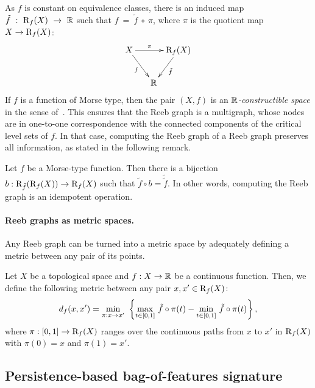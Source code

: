%
As $f$ is constant on equivalence classes, there is an induced map 
$\tilde{f}~:~\mathrm{R}_f(X)~\rightarrow~\mathbb{R}$ such that $f~=~\tilde{f}~\circ~\pi$,
where $\pi$ is the quotient map $X\to \mathrm{R}_f(X)$:
%
\begin{equation}\label{eq:triangleReeb}
\xymatrix@!C=5pt{
X \ar[rr]^-\pi \ar[dr]_-f && \Reeb_f(X) \ar[dl]^-{\tilde f}\\
& \R
}
\end{equation}
%
If $f$ is a function of Morse type, then
the pair $(X,f)$ is an {\em $\mathbb{R}$-constructible space} in the sense
of~\cite{deSilva16}.  This ensures that the Reeb graph is a
multigraph, whose nodes are in one-to-one correspondence with the connected components
of the critical level sets of $f$.
In that case, computing the Reeb graph of a Reeb graph preserves all information,
as stated in the following remark.

\begin{rmq}\label{rem:idemreeb}
Let $f$ be a Morse-type function.
Then there is a bijection $b:\mathrm{R}_{\tilde f}(\mathrm{R}_f(X))\rightarrow\mathrm{R}_f(X)$
such that $\tilde f\circ b = \tilde{\tilde f}$. In other words, computing the Reeb graph is an idempotent operation.
\end{rmq}

 
\paragraph*{Reeb graphs as metric spaces.} Any Reeb graph can be turned into a metric space by 
adequately defining a metric between any pair of its points.

\begin{defin}\label{def:metricReeb}
Let $X$ be a topological space and $f:X\rightarrow\mathbb{R}$ be a continuous function.
Then, we define the following metric between any pair $x,x'\in\mathrm{R}_f(X)$:
$$d_f(x,x')=\underset{\pi:x\rightarrow x'}{\rm min}\ \left\{
\underset{t\in[0,1]}{\max}\ \tilde f\circ\pi(t)-\underset{t\in[0,1]}{\min}\ \tilde f\circ\pi(t)\right\},$$ 
where $\pi:[0,1]\rightarrow\mathrm{R}_f(X)$ ranges over the continuous paths from $x$ to $x'$ in $\mathrm{R}_f(X)$ with $\pi(0)=x$ and $\pi(1)=x'$.
\end{defin} 




\subsection{Persistence-based bag-of-features signature}
\label{sec:dictionary}


